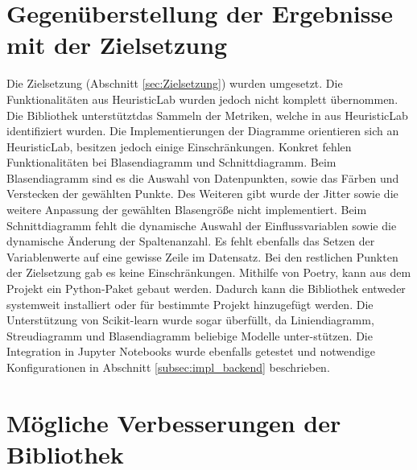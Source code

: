 \section{Gegenüberstellung der Ergebnisse mit der Zielsetzung}
\label{sec:eval_zielvorgabe}

Die Zielsetzung (Abschnitt \ref{sec:Zielsetzung}) wurden umgesetzt. Die Funktionalitäten aus HeuristicLab wurden jedoch nicht komplett übernommen. Die Bibliothek unterstützt\linebreak das Sammeln der Metriken, welche in aus HeuristicLab identifiziert wurden. Die Implementierungen der Diagramme orientieren sich an HeuristicLab, besitzen jedoch einige Einschränkungen. Konkret fehlen Funktionalitäten bei Blasendiagramm und Schnittdiagramm. Beim Blasendiagramm sind es die Auswahl von Datenpunkten, sowie das Färben und Verstecken der gewählten Punkte. Des Weiteren gibt wurde der Jitter sowie die weitere Anpassung der gewählten Blasengröße nicht implementiert. Beim Schnittdiagramm fehlt die dynamische Auswahl der Einflussvariablen sowie die dynamische Änderung der Spaltenanzahl. Es fehlt ebenfalls das Setzen der Variablenwerte auf eine gewisse Zeile im Datensatz. Bei den restlichen Punkten der Zielsetzung gab es keine Einschränkungen. Mithilfe von Poetry, kann aus dem Projekt ein Python-Paket gebaut werden. Dadurch kann die Bibliothek entweder systemweit installiert oder für bestimmte Projekt hinzugefügt werden. Die Unterstützung von Scikit-learn wurde sogar überfüllt, da Liniendiagramm, Streudiagramm und Blasendiagramm beliebige Modelle unter-stützen. Die Integration in Jupyter Notebooks wurde ebenfalls getestet und notwendige Konfigurationen in Abschnitt \ref{subsec:impl_backend} beschrieben.

\section{Mögliche Verbesserungen der Bibliothek}
\label{sec:eval_improvements}

